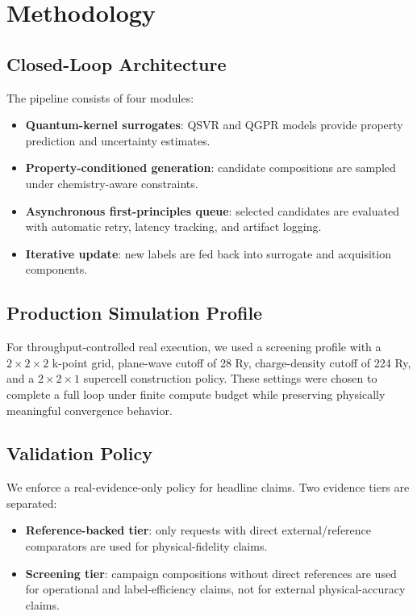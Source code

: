 \documentclass[11pt]{article}
\begin{document}
\section{Methodology}
\subsection{Closed-Loop Architecture}
The pipeline consists of four modules:
\begin{itemize}
  \item \textbf{Quantum-kernel surrogates}: QSVR and QGPR models provide property prediction and uncertainty estimates.
  \item \textbf{Property-conditioned generation}: candidate compositions are sampled under chemistry-aware constraints.
  \item \textbf{Asynchronous first-principles queue}: selected candidates are evaluated with automatic retry, latency tracking, and artifact logging.
  \item \textbf{Iterative update}: new labels are fed back into surrogate and acquisition components.
\end{itemize}

\subsection{Production Simulation Profile}
For throughput-controlled real execution, we used a screening profile with a $2\times2\times2$ k-point grid, plane-wave cutoff of 28 Ry, charge-density cutoff of 224 Ry, and a $2\times2\times1$ supercell construction policy. These settings were chosen to complete a full loop under finite compute budget while preserving physically meaningful convergence behavior.

\subsection{Validation Policy}
We enforce a real-evidence-only policy for headline claims. Two evidence tiers are separated:
\begin{itemize}
  \item \textbf{Reference-backed tier}: only requests with direct external/reference comparators are used for physical-fidelity claims.
  \item \textbf{Screening tier}: campaign compositions without direct references are used for operational and label-efficiency claims, not for external physical-accuracy claims.
\end{itemize}
\end{document}
